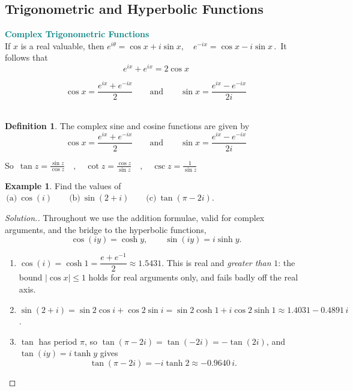 \documentclass[11pt,a4paper]{article}
\theoremstyle{definition}
\newtheorem{definition}[thm]{Definition}
\newtheorem{example}[thm]{Example}
\newenvironment{solution}
  {\renewcommand{\qedsymbol}{}\begin{proof}[\textit{Solution}.]}
  {\end{proof}}
\begin{document}
{\color[wave]{485}\subsection{Trigonometric and Hyperbolic Functions}}

\textbf{\textcolor{teal}{Complex Trigonometric Functions}}\\
If $x$ is a real valuable, then $e^{i\theta} = \cos x + i\sin x,\quad  e^{-ix} = \cos x - i\sin x\,.\,$ It follows that 
$$e^{ix} + e^{ix} = 2\cos x$$

$$\boxed{\cos x = \frac{e^{ix} + e^{-ix}}{2}\qquad \text{and}\qquad  \sin x = \frac{e^{ix} - e^{-ix}}{2i}}$$\\



\begin{definition}
The complex sine and cosine functions are given by $$\cos x = \frac{e^{ix} + e^{-ix}}{2}\qquad \text{and}\qquad  \sin x = \frac{e^{ix} - e^{-ix}}{2i}$$

So $\, \tan z = \frac{\sin z}{\cos z}\quad ,\quad  \cot z = \frac{\cos z}{\sin z}\quad ,\quad \csc z = \frac{1}{\sin z}$
\end{definition}

\begin{example}
Find the values of
$\,\text{(a)}\ \cos (i)\qquad \text{(b)}\ \sin (2 + i)\qquad
\text{(c)}\ \tan (\pi - 2i)$.
\end{example}
\begin{solution}
Throughout we use the addition formulae, valid for complex arguments, and the
bridge to the hyperbolic functions,
$$\cos(iy)=\cosh y,\qquad \sin(iy)=i\sinh y .$$
\begin{enumerate}
\item[(a)] $\cos(i)=\cosh 1=\dfrac{e+e^{-1}}{2}\approx 1.5431$. This is real and
\emph{greater than} $1$: the bound $\left|\cos x\right|\leq 1$ holds for real
arguments only, and fails badly off the real axis.
\item[(b)] $\sin(2+i)=\sin 2\cos i+\cos 2\sin i=\sin 2\cosh 1+i\cos 2\sinh 1
\approx 1.4031-0.4891\,i$.
\item[(c)] $\tan$ has period $\pi$, so $\tan(\pi-2i)=\tan(-2i)=-\tan(2i)$, and
$\tan(iy)=i\tanh y$ gives
$$\tan(\pi-2i)=-i\tanh 2\approx -0.9640\,i .$$
\end{enumerate}
\end{solution}
\end{document}
